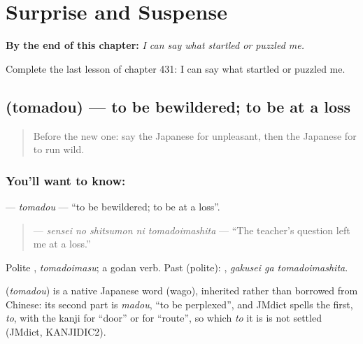 
\chapter{Surprise and Suspense}
\label{ch:ja-surprise-and-suspense}

\begin{chapteropening}
\textbf{By the end of this chapter:} \emph{I can say what startled or puzzled me.}

Complete the last lesson of chapter 431: I can say what startled or puzzled me.
\end{chapteropening}

\section[\texorpdfstring{\ja{とまどう} (tomadou)}{とまどう (tomadou)}]{ (tomadou) — to be bewildered; to be at a loss}

\label{lesson:JA-C431-tomadou}



\begin{quote}
Before the new one: say the Japanese for unpleasant, then the Japanese for to run wild.
\end{quote}

\subsection*{You'll want to know: }
\textbf{} — \emph{tomadou} — \textquotedblleft{}to be bewildered; to be at a loss\textquotedblright{}.

\begin{quote}
\textbf{  } — \emph{sensei no shitsumon ni tomadoimashita} — \textquotedblleft{}The teacher's question left me at a loss.\textquotedblright{}
\end{quote}

Polite \textbf{}, \emph{tomadoimasu}; a godan verb. Past (polite): \textbf{ }, \emph{gakusei ga tomadoimashita}.

\begin{cousinweb}
\textbf{} (\emph{tomadou}) is a native Japanese word (wago), inherited rather than borrowed from Chinese: its second part is \emph{madou}, \textquotedblleft{}to be perplexed\textquotedblright{}, and JMdict spells the first, \emph{to}, with the kanji for \textquotedblleft{}door\textquotedblright{} or for \textquotedblleft{}route\textquotedblright{}, so which \emph{to} it is is not settled (JMdict, KANJIDIC2).
\end{cousinweb}

